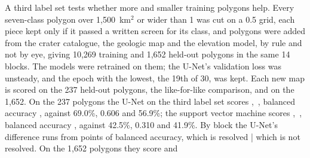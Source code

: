 A third label set tests whether more and smaller training polygons help. Every seven-class polygon over
1,500~km$^2$ or wider than 1\textdegree{} was cut on a 0.5\textdegree{} grid, each piece kept only if it passed a
written screen for its class, and polygons were added from the crater catalogue, the geologic map and the elevation
model, by rule and not by eye, giving 10,269 training and 1,652 held-out polygons in the same 14 blocks. The models
were retrained on them; the U-Net's validation loss was unsteady, and the epoch with the lowest, the 19th of 30, was kept.
Each new map is scored on the 237 held-out polygons, the like-for-like comparison, and on the 1,652. %
On the 237 polygons the U-Net on the third label set scores ,
\kap\,, balanced accuracy ,
against 69.0\%, 0.606 and 56.9\%; the support vector machine scores ,
\kap\,, balanced accuracy ,
against 42.5\%, 0.310 and 41.9\%. By block the U-Net's difference runs from
 points of balanced accuracy, {which is resolved
| which is not resolved}. On the 1,652 polygons they score  and
